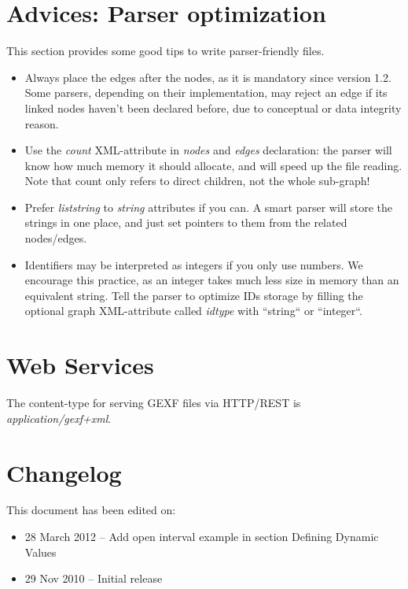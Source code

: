 \documentclass[a4paper,10pt]{article}
\begin{document}
\section{Advices: Parser optimization} \label{advices}

This section provides some good tips to write parser-friendly files.
\begin{itemize}
 \item Always place the edges after the nodes, as it is mandatory since version 1.2. Some parsers, depending on their implementation, may reject an edge if its linked nodes haven't been declared before, due to conceptual or data integrity reason.
 \item Use the \textit{count} XML-attribute in \textit{nodes} and \textit{edges} declaration: the parser will know how much memory it should allocate, and will speed up the file reading. Note that count only refers to direct children, not the whole sub-graph!
 \item Prefer \textit{liststring} to \textit{string} attributes if you can. A smart parser will store the strings in one place, and just set pointers to them from the related nodes/edges.
 \item Identifiers may be interpreted as integers if you only use numbers. We encourage this practice, as an integer takes much less size in memory than an equivalent string. Tell the parser to optimize IDs storage by filling the optional graph XML-attribute called \textit{idtype} with “string“ or “integer“.
\end{itemize}

\section{Web Services} \label{ws}

The content-type for serving GEXF files via HTTP/REST is \textit{application/gexf+xml}.

\section{Changelog} \label{changelog}

This document has been edited on:
\begin{itemize}
\item 28 March 2012 -- Add open interval example in section Defining Dynamic Values
\item 29 Nov 2010 -- Initial release
\end{itemize}

\printindex
\end{document}

